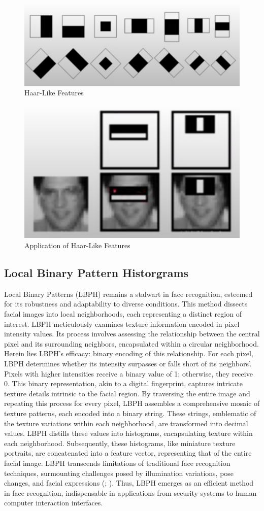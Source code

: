 \documentclass[
]{article}
\begin{document}
\begin{figure}[htbp]
  \centering
  \includegraphics[width=0.4\linewidth]{images/haar_features.png}
  \caption{Haar-Like Features}
\end{figure}

\begin{figure}[htbp]
  \centering
  \includegraphics[width=0.4\linewidth]{images/haar_features_1.png}
  \caption{Application of Haar-Like Features}
\end{figure}

\begin{multicols}{2}

\section{Local Binary Pattern Historgrams}
Local Binary Patterns (LBPH) remains a stalwart in face recognition, esteemed for its robustness and adaptability to diverse conditions. This method dissects facial images into local neighborhoods, each representing a distinct region of interest. LBPH meticulously examines texture information encoded in pixel intensity values. Its process involves assessing the relationship between the central pixel and its surrounding neighbors, encapsulated within a circular neighborhood. Herein lies LBPH's efficacy: binary encoding of this relationship. For each pixel, LBPH determines whether its intensity surpasses or falls short of its neighbors'. Pixels with higher intensities receive a binary value of 1; otherwise, they receive 0. This binary representation, akin to a digital fingerprint, captures intricate texture details intrinsic to the facial region. By traversing the entire image and repeating this process for every pixel, LBPH assembles a comprehensive mosaic of texture patterns, each encoded into a binary string. These strings, emblematic of the texture variations within each neighborhood, are transformed into decimal values. LBPH distills these values into histograms, encapsulating texture within each neighborhood. Subsequently, these histograms, like miniature texture portraits, are concatenated into a feature vector, representing that of the entire facial image. LBPH transcends limitations of traditional face recognition techniques, surmounting challenges posed by illumination variations, pose changes, and facial expressions (\cite{ahonen2004}; \cite{tan2007}). Thus, LBPH emerges as an efficient method in face recognition, indispensable in applications from security systems to human-computer interaction interfaces.

\end{multicols}
\end{document}
